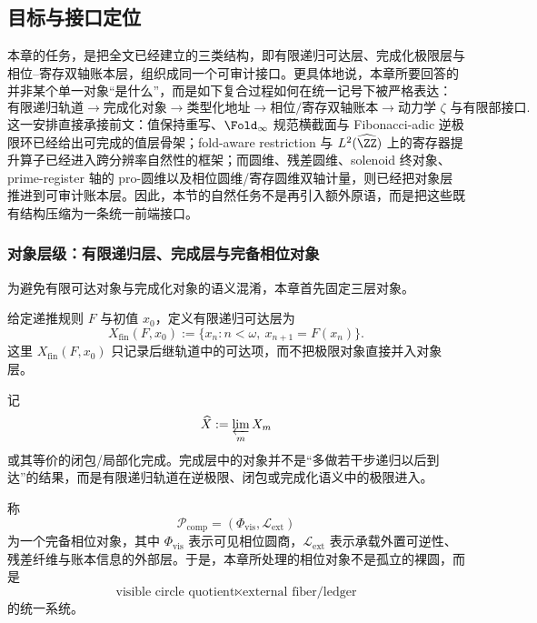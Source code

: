 \subsection{目标与接口定位}\label{subsec:typed-address-biaxial-completion-objective-interface}
本章的任务，是把全文已经建立的三类结构，即有限递归可达层、完成化极限层与相位--寄存双轴账本层，组织成同一个可审计接口。更具体地说，本章所要回答的并非某个单一对象“是什么”，而是如下复合过程如何在统一记号下被严格表达：
\[
\text{有限递归轨道}
\longrightarrow
\text{完成化对象}
\longrightarrow
\text{类型化地址}
\longrightarrow
\text{相位/寄存双轴账本}
\longrightarrow
\text{动力学 }\zeta\text{ 与有限部接口}.
\]
这一安排直接承接前文：值保持重写、\(\Fold_\infty\) 规范横截面与 Fibonacci-adic 逆极限环已经给出可完成的值层骨架；fold-aware restriction 与 \(L^2(\widehat{\ZZ})\) 上的寄存器提升算子已经进入跨分辨率自然性的框架；而圆维、残差圆维、solenoid 终对象、prime-register 轴的 pro-圆维以及相位圆维/寄存圆维双轴计量，则已经把对象层推进到可审计账本层。因此，本节的自然任务不是再引入额外原语，而是把这些既有结构压缩为一条统一前端接口。

\subsubsection{对象层级：有限递归层、完成层与完备相位对象}\label{subsubsec:typed-address-biaxial-completion-object-hierarchy}
为避免有限可达对象与完成化对象的语义混淆，本章首先固定三层对象。

\begin{definition}[有限递归层]\label{def:typed-address-biaxial-completion-finite-layer}
给定递推规则 \(F\) 与初值 \(x_0\)，定义有限递归可达层为
\[
X_{\mathrm{fin}}(F,x_0)
:=
\{x_n:n<\omega,\ x_{n+1}=F(x_n)\}.
\]
这里 \(X_{\mathrm{fin}}(F,x_0)\) 只记录后继轨道中的可达项，而不把极限对象直接并入对象层。
\end{definition}

\begin{definition}[完成层]\label{def:typed-address-biaxial-completion-completed-layer}
记
\[
\widehat X:=\varprojlim_m X_m
\]
或其等价的闭包/局部化完成。完成层中的对象并不是“多做若干步递归以后到达”的结果，而是有限递归轨道在逆极限、闭包或完成化语义中的极限进入。
\end{definition}

\begin{definition}[完备相位对象]\label{def:typed-address-biaxial-completion-complete-phase-object}
称
\[
\mathcal P_{\mathrm{comp}}=(\Phi_{\mathrm{vis}},\mathcal L_{\mathrm{ext}})
\]
为一个完备相位对象，其中 \(\Phi_{\mathrm{vis}}\) 表示可见相位圆商，\(\mathcal L_{\mathrm{ext}}\) 表示承载外置可逆性、残差纤维与账本信息的外部层。于是，本章所处理的相位对象不是孤立的裸圆，而是
\[
\text{visible circle quotient}\ltimes \text{external fiber/ledger}
\]
的统一系统。
\end{definition}

